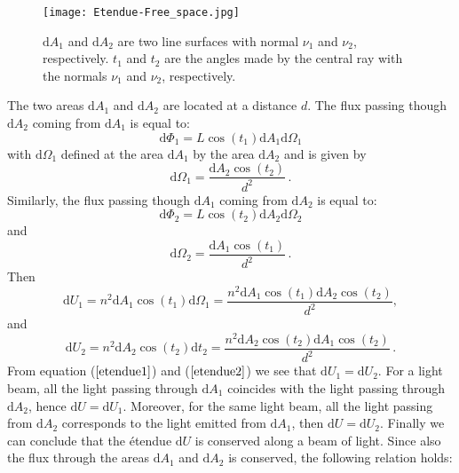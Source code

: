 \begin{figure}[h]
 \label{fig:etendue_conservation}
     \begin{center}
     \texttt{[image: Etendue-Free\_space.jpg]}
     \end{center}
     \caption{\footnotesize{$\textrm{d}A_1$ and $\textrm{d}A_2$ are two line surfaces with normal $\nu_1$ and $\nu_2$, respectively. $t_1$ and $t_2$ are the angles made by the central ray with the normals $\nu_1$ and $\nu_2$, respectively.}}
\label{fig:etendue_conservation}
 \end{figure}
The two areas $\textrm{d}A_1$ and $\textrm{d}A_2$ are located at a distance $d$. The flux passing though $\textrm{d}A_2$ coming from $\textrm{d}A_1$ is equal to:
\begin{equation}
\textrm{d}\Phi_1 = L \cos(t_1) \textrm{d}A_1 \textrm{d}\Omega_1
\end{equation}
with $\textrm{d}\Omega_1$ defined at the area $\textrm{d}A_1$ by the area $\textrm{d}A_2$ and is given by 
\begin{equation}
\textrm{d}\Omega_1 = \frac{\textrm{d}A_2\cos(t_2)}{d^2}\,.
\end{equation}
Similarly, the flux passing though $\textrm{d}A_1$ coming from $\textrm{d}A_2$ is equal to:
\begin{equation}
\textrm{d}\Phi_2 = L \cos(t_2) \textrm{d}A_2 \textrm{d}\Omega_2
\end{equation}
and
\begin{equation}
\textrm{d}\Omega_2 = \frac{\textrm{d}A_1\cos(t_1)}{d^2}\,.
\end{equation}
Then \begin{equation}
\label{etendue1}
\textrm{d}U_1 = n^2 \textrm{d}A_1\cos(t_1)\textrm{d}\Omega_1= \frac{n^2 \textrm{d}A_1\cos(t_1)\textrm{d}A_2\cos(t_2)}{d^2},
\end{equation}
and
\begin{equation}
\label{etendue2}
\textrm{d}U_2 = n^2 \textrm{d}A_2\cos(t_2)\textrm{d}t_2= \frac{ n^2 \textrm{d}A_2\cos(t_2)\textrm{d}A_1\cos(t_2)}{d^2}\,.
\end{equation}
From equation ($\ref{etendue1}$) and ($\ref{etendue2}$) we see that $\textrm{d}U_1=\textrm{d}U_2$.
For a light beam, all the light passing through $\textrm{d}A_1$ coincides with the light passing through $\textrm{d}A_2$, hence $\textrm{d}U = \textrm{d}U_1$. Moreover, for the same light beam, all the light passing from $\textrm{d}A_2$ corresponds to the light emitted from $\textrm{d}A_1$, then $\textrm{d}U=\textrm{d}U_2$. Finally we can conclude that the \'{e}tendue $\textrm{d}U$ is conserved along a beam of light. Since also the flux through the areas $\textrm{d}A_1$ and $\textrm{d}A_2$ is conserved, the following relation holds:
